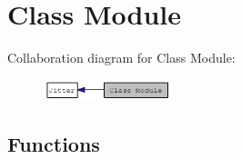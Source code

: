 \hypertarget{group__classmod}{
\section{Class Module}
\label{group__classmod}
}


Collaboration diagram for Class Module:\nopagebreak
\begin{figure}[H]
\begin{center}
\leavevmode
\includegraphics[width=105pt]{group__classmod}
\end{center}
\end{figure}
\subsection*{Functions}
